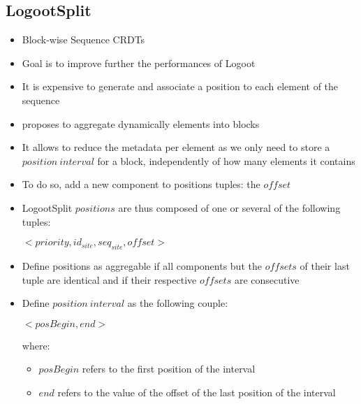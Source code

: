 \documentclass{article}
\begin{document}
\subsection{LogootSplit \cite{AndreCollaborateCom2013}}

\begin{itemize}
    \item Block-wise Sequence \acp{CRDT}
    \item Goal is to improve further the performances of Logoot
    \item It is expensive to generate and associate a position to each element of the sequence
    \item \textcite{AndreCollaborateCom2013} proposes to aggregate dynamically elements into blocks
    \item It allows to reduce the metadata per element as we only need to store a $position \ interval$ for a block, independently of how many elements it contains
    \item To do so, add a new component to positions tuples: the $offset$ 
    \item LogootSplit $positions$ are thus composed of one or several of the following tuples:

    \begin{center}
        $<priority, id_{site}, seq_{site}, offset>$
    \end{center}

    \item Define positions as aggregable if all components but the $offsets$ of their last tuple are identical and if their respective $offsets$ are consecutive
    \item Define $position \ interval$ as the following couple:

    \begin{center}
        $<posBegin, end>$
    \end{center}

    where:

    \begin{itemize}
        \item $posBegin$ refers to the first position of the interval
        \item $end$ refers to the value of the offset of the last position of the interval
    \end{itemize}


\end{itemize}
\end{document}
